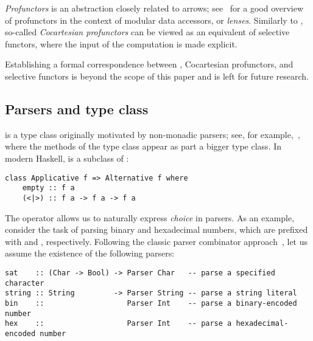 \emph{Profunctors} is an abstraction closely related to arrows;
see~\citep{pickering2017profunctor} for a good overview of profunctors in the
context of modular data accessors, or \emph{lenses}. Similarly to
, so-called \emph{Cocartesian profunctors} can be viewed as an
equivalent of selective functors, where the input of the computation is made
explicit.

Establishing a formal correspondence between , Cocartesian
profunctors, and selective functors is beyond the scope of this paper and is
left for future research.

\subsection{Parsers and  type class}\label{sec-alternative-functors}

 is a type class originally motivated by non-monadic parsers;
see, for example,~\citet{swierstra1996parsers}, where the methods of the
 type class appear as part a bigger  type class. In
modern Haskell,  is a subclass of :

\vspace{1mm}
\begin{verbatim}
class Applicative f => Alternative f where
    empty :: f a
    (<|>) :: f a -> f a -> f a
\end{verbatim}
\vspace{1mm}

\noindent
The operator \hs{<|>} allows us to naturally express \emph{choice} in parsers.
As an example, consider the task of parsing binary and hexadecimal numbers,
which are prefixed with  and , respectively. Following the
classic parser combinator approach~\citep{hutton1998monadic}, let us assume the
existence of the following parsers:

\vspace{1mm}
\begin{verbatim}
sat    :: (Char -> Bool) -> Parser Char   -- parse a specified character
string :: String         -> Parser String -- parse a string literal
bin    ::                   Parser Int    -- parse a binary-encoded number
hex    ::                   Parser Int    -- parse a hexadecimal-encoded number
\end{verbatim}
\vspace{1mm}

